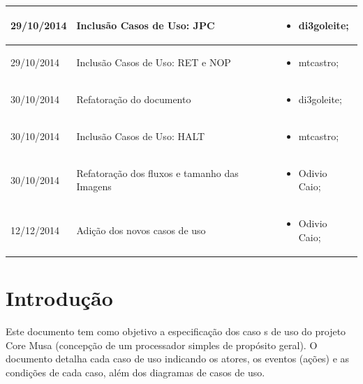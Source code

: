 \documentclass{article}
\begin{document}
\begin{table}[ht]
\begin{tabular}[pos]{|m{2cm} | m{7.2cm} | m{3.8cm}|}
	  \small 29/10/2014 & \small Inclusão Casos de Uso: JPC & \small 
	  \begin{itemize}
	  	\item di3goleite; 
	  \end{itemize}  
	  \\ \hline
	  
	  \small 29/10/2014 & \small Inclusão Casos de Uso: RET e NOP & \small 
      \begin{itemize}
      	\item mtcastro; 
	  \end{itemize}  
	  \\ \hline
	  
	  \small 30/10/2014 & \small Refatoração do documento & \small 
	  \begin{itemize}
	  	\item di3goleite; 
	  \end{itemize}  
	  \\ \hline
	  	 
	  \small 30/10/2014 & \small Inclusão Casos de Uso: HALT & \small 
      \begin{itemize}
      	\item mtcastro; 
	  \end{itemize}
 	   \\ \hline

 	 \small 30/10/2014 & \small Refatoração dos fluxos e tamanho das Imagens & \small 
      \begin{itemize}
      	\item Odivio Caio; 
	  \end{itemize}
	  \\ \hline

	\small 12/12/2014 & \small Adição dos novos casos de uso& \small 
      \begin{itemize}
      	\item Odivio Caio; 
	  \end{itemize}
	  
	  \\ \hline
    \end{tabular}
  \end{table}

\newpage

\tableofcontents
\newpage

\section{Introdução}
Este documento tem como objetivo a especificação dos caso
s de uso do projeto Core Musa (concepção de um processador simples de propósito geral). O documento detalha cada caso de uso indicando os atores, os eventos (ações) e as condições de cada caso, além dos diagramas de casos de uso.
\end{document}
